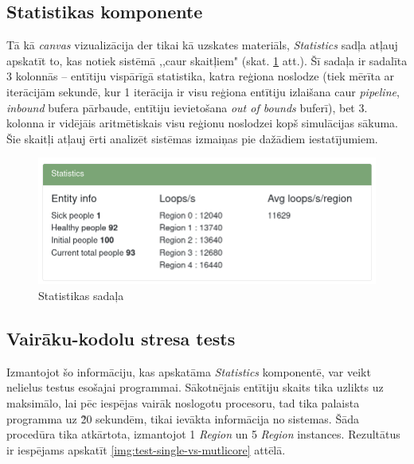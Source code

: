 \subsection{Statistikas komponente}

Tā kā \emph{canvas} vizualizācija der tikai kā uzskates materiāls, \emph{Statistics}
sadļa atļauj apskatīt to, kas notiek sistēmā ,,caur skaitļiem" (skat. \ref{img:statistics} att.).
Šī sadaļa ir sadalīta 3 kolonnās -- entītiju vispārīgā statistika, katra reģiona
noslodze (tiek mērīta ar iterācijām sekundē, kur 1 iterācija ir visu reģiona entītiju
izlaišana caur \emph{pipeline}, \emph{inbound} bufera pārbaude, entītiju ievietošana
\emph{out of bounds} buferī), bet 3. kolonna ir vidējāis aritmētiskais visu reģionu
noslodzei kopš simulācijas sākuma. Šie skaitļi atļauj ērti analizēt sistēmas
izmaiņas pie dažādiem iestatījumiem.

\begin{figure}[H]
	\centering
	\includegraphics[scale=0.5]{images/statistics.png}
	\caption{Statistikas sadaļa}
	\label{img:statistics}
\end{figure}

\subsection{Vairāku-kodolu stresa tests}
Izmantojot šo informāciju, kas apskatāma \emph{Statistics} komponentē, var veikt
nelielus testus esošajai programmai. Sākotnējais entītiju skaits tika uzlikts uz
maksimālo, lai pēc iespējas vairāk noslogotu procesoru, tad tika palaista programma
uz \~ 20 sekundēm, tikai ievākta informācija no sistemas. Šāda procedūra tika
atkārtota, izmantojot 1 \emph{Region} un 5 \emph{Region} instances. Rezultātus
ir iespējams apskatīt \ref{img:test-single-vs-mutlicore} attēlā.


